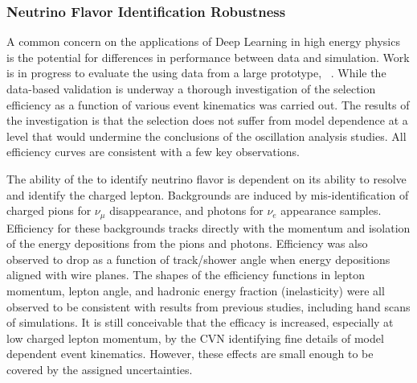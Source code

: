 \subsubsection{Neutrino Flavor Identification Robustness}
A common concern on the applications of Deep Learning in high energy physics is the potential for differences in performance between data and simulation. Work is in progress to evaluate the   using data from a large  prototype, ~\cite{Abi:2017aow}.
While the data-based validation is underway a thorough investigation of the selection efficiency as a function of various event kinematics was carried out. The results of the investigation is that the  selection does not suffer from model dependence at a level that would undermine the conclusions of the oscillation analysis studies. All efficiency curves are consistent with a few key observations. 

The ability of the  to identify neutrino flavor is dependent on its ability to resolve and identify the charged lepton. %
Backgrounds are induced by mis-identification of charged pions for $\nu_{\mu}$ disappearance, and photons for $\nu_{e}$ appearance samples. Efficiency for these backgrounds tracks directly with the momentum and isolation of the energy depositions from the pions and photons. Efficiency was also observed to drop as a function of track/shower angle when energy depositions aligned with wire planes. The shapes of the efficiency functions in lepton momentum, lepton angle, and hadronic energy fraction (inelasticity) were all observed to be consistent with results from previous studies, including hand scans of  simulations. It is still conceivable that the efficacy is increased, especially at low charged lepton momentum, by the CVN identifying fine details of model dependent event kinematics. However, these effects are small enough to be covered by the assigned uncertainties. 



